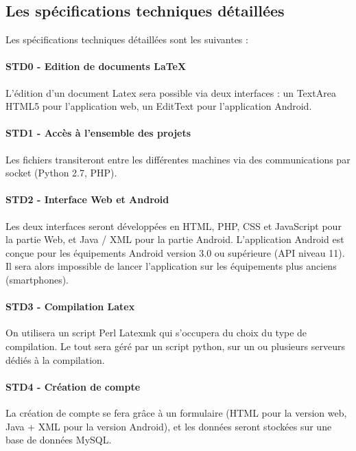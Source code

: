 \documentclass[a4paper,12pt]{article}
\begin{document}
\subsection{Les spécifications techniques détaillées}
Les spécifications techniques détaillées sont les suivantes :

\paragraph{STD0 - Edition de documents LaTeX\\}
L'édition d'un document Latex sera possible via deux interfaces : un TextArea HTML5 pour l'application web, un EditText pour l'application Android.

\paragraph{STD1 - Accès à l'ensemble des projets\\}
Les fichiers transiteront entre les différentes machines via des communications par socket (Python 2.7, PHP).

\paragraph{STD2 - Interface Web et Android\\}
Les deux interfaces seront développées en HTML, PHP, CSS et JavaScript pour la partie Web, et Java / XML pour la partie Android. L'application Android est conçue pour les équipements Android version 3.0 ou supérieure (API niveau 11). Il sera alors impossible 
de lancer l'application sur les équipements plus anciens (smartphones).

\paragraph{STD3 - Compilation Latex\\}
On utilisera un script Perl Latexmk qui s'occupera du choix du type de compilation. Le tout sera géré par un script python, sur un ou plusieurs serveurs dédiés à la compilation.

\paragraph{STD4 - Création de compte\\}
La création de compte se fera grâce à un formulaire (HTML pour la version web, Java + XML pour la version Android), et les données seront stockées sur une base de données MySQL.
\end{document}
